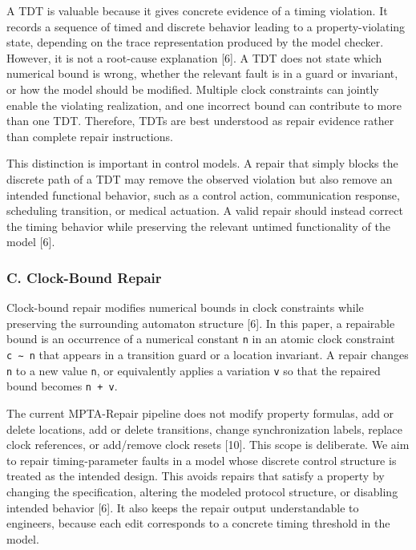 \documentclass[
]{article}
\begin{document}
A TDT is valuable because it gives concrete evidence of a timing
violation. It records a sequence of timed and discrete behavior leading
to a property-violating state, depending on the trace representation
produced by the model checker. However, it is not a root-cause
explanation {[}6{]}. A TDT does not state which numerical bound is
wrong, whether the relevant fault is in a guard or invariant, or how the
model should be modified. Multiple clock constraints can jointly enable
the violating realization, and one incorrect bound can contribute to
more than one TDT. Therefore, TDTs are best understood as repair
evidence rather than complete repair instructions.

This distinction is important in control models. A repair that simply
blocks the discrete path of a TDT may remove the observed violation but
also remove an intended functional behavior, such as a control action,
communication response, scheduling transition, or medical actuation. A
valid repair should instead correct the timing behavior while preserving
the relevant untimed functionality of the model {[}6{]}.

\subsubsection{C. Clock-Bound Repair}\label{c.-clock-bound-repair}

Clock-bound repair modifies numerical bounds in clock constraints while
preserving the surrounding automaton structure {[}6{]}. In this paper, a
repairable bound is an occurrence of a numerical constant \texttt{n} in
an atomic clock constraint \texttt{c\ ∼\ n} that appears in a transition
guard or a location invariant. A repair changes \texttt{n} to a new
value \texttt{n\textquotesingle{}}, or equivalently applies a variation
\texttt{v} so that the repaired bound becomes \texttt{n\ +\ v}.

The current MPTA-Repair pipeline does not modify property formulas, add
or delete locations, add or delete transitions, change synchronization
labels, replace clock references, or add/remove clock resets {[}10{]}.
This scope is deliberate. We aim to repair timing-parameter faults in a
model whose discrete control structure is treated as the intended
design. This avoids repairs that satisfy a property by changing the
specification, altering the modeled protocol structure, or disabling
intended behavior {[}6{]}. It also keeps the repair output
understandable to engineers, because each edit corresponds to a concrete
timing threshold in the model.
\end{document}
